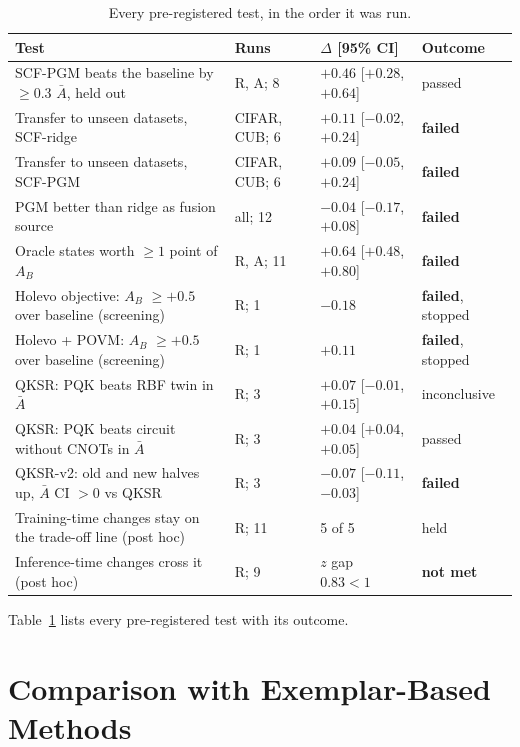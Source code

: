 \begin{table}[t]
\centering
\small
\begin{tabular}{llll}
\toprule
Test & Runs & $\Delta$ [95\% CI] & Outcome \\
\midrule
SCF-PGM beats the baseline by $\ge0.3$ $\bar A$, held out & R, A; 8 & $+0.46$ [$+0.28$, $+0.64$] & passed \\
Transfer to unseen datasets, SCF-ridge & CIFAR, CUB; 6 & $+0.11$ [$-0.02$, $+0.24$] & \textbf{failed} \\
Transfer to unseen datasets, SCF-PGM & CIFAR, CUB; 6 & $+0.09$ [$-0.05$, $+0.24$] & \textbf{failed} \\
PGM better than ridge as fusion source & all; 12 & $-0.04$ [$-0.17$, $+0.08$] & \textbf{failed} \\
Oracle states worth $\ge1$ point of $A_B$ & R, A; 11 & $+0.64$ [$+0.48$, $+0.80$] & \textbf{failed} \\
Holevo objective: $A_B$ $\ge+0.5$ over baseline (screening) & R; 1 & $-0.18$ & \textbf{failed}, stopped \\
Holevo + POVM: $A_B$ $\ge+0.5$ over baseline (screening) & R; 1 & $+0.11$ & \textbf{failed}, stopped \\
QKSR: PQK beats RBF twin in $\bar A$ & R; 3 & $+0.07$ [$-0.01$, $+0.15$] & inconclusive \\
QKSR: PQK beats circuit without CNOTs in $\bar A$ & R; 3 & $+0.04$ [$+0.04$, $+0.05$] & passed \\
QKSR-v2: old and new halves up, $\bar A$ CI $>0$ vs QKSR & R; 3 & $-0.07$ [$-0.11$, $-0.03$] & \textbf{failed} \\
Training-time changes stay on the trade-off line (post hoc) & R; 11 & 5 of 5 & held \\
Inference-time changes cross it (post hoc) & R; 9 & $z$ gap $0.83<1$ & \textbf{not met} \\
\bottomrule
\end{tabular}
\caption{Every pre-registered test, in the order it was run.}
\label{tab:tests}
\end{table}

Table~\ref{tab:tests} lists every pre-registered test with its outcome.

\section{Comparison with Exemplar-Based Methods}
\label{app:exemplar}

